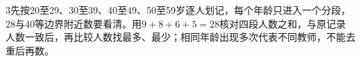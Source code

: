 \documentclass[multi=snippet,border={5bp 20bp 5bp 5bp}]{standalone}
\newenvironment{snippet}[3]{\begin{minipage}{#1bp}\color{answerred}\fontsize{#2}{#3}\selectfont\raggedright}{\end{minipage}}
\begin{document}
\begin{snippet}{505}{11.5}{14}\begin{multicols}{3}\raggedcolumns 先按20至29、30至39、40至49、50至59岁逐人划记，每个年龄只进入一个分段，28与40等边界附近数要看清。用\(9+8+6+5=28\)\allowbreak 核对四段人数之和，与原记录人数一致后，再比较人数找最多、最少；相同年龄出现多次代表不同教师，不能去重后再数。\end{multicols}\end{snippet}
\end{document}
